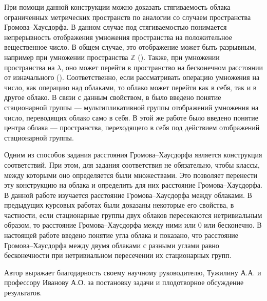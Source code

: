 При помощи данной конструкции можно доказать стягиваемость облака
ограниченных метрических пространств по аналогии со случаем пространства
Громова--Хаусдорфа. В данном случае под стягиваемостью понимается
непрерывность отображения умножения пространства на положительное
вещественное число.
В общем случае, это отображение может быть разрывным, например при умножении
пространства \( \mathbb{Z} \)
(\cite{mikhailov2025newgeodesiclinesgromovhausdorff}). Также, при умножении пространства на \( \lambda \), оно может перейти в пространство на бесконечном расстоянии от изначального (\cite{TuzhBog1}).
Соответственно, если рассматривать операцию умножения на число, как операцию
над облаками, то облако может перейти как в себя, так и в другое облако. В
связи с данным свойством, в \cite{TuzhBog2} было введено понятие стационарной
группы --- мультипликативной группы отображений умножения на число,
переводящих облако само в себя. В этой же работе было введено понятие центра
облака --- пространства, переходящего в себя под действием отображений
стационарной группы.

Одним из способов задания расстояния Громова--Хаусдорфа является конструкция соответствий. При этом, для задания соответствия не обязательно, чтобы классы, между которыми оно определяется были множествами. Это позволяет перенести эту конструкцию на облака и определить для них расстояние Громова--Хаусдорфа.
В данной работе изучается расстояние Громова--Хаусдорфа между облаками. В
предыдущих курсовых работах были доказаны некоторые его свойства, в
частности, если стационарные группы двух облаков пересекаются нетривиальным
образом, то расстояние Громова--Хаусдорфа между ними или \( 0 \) или
бесконечно. В настоящей работе введено понятие угла облака и показано, что
расстояние Громова--Хаусдорфа между двумя облаками с разными углами равно
бесконечности при нетривиальном пересечении их стационарных групп.

Автор выражает благодарность своему научному руководителю, Тужилину А.А. и
профессору Иванову А.О. за постановку задачи и плодотворное обсуждение
результатов.
